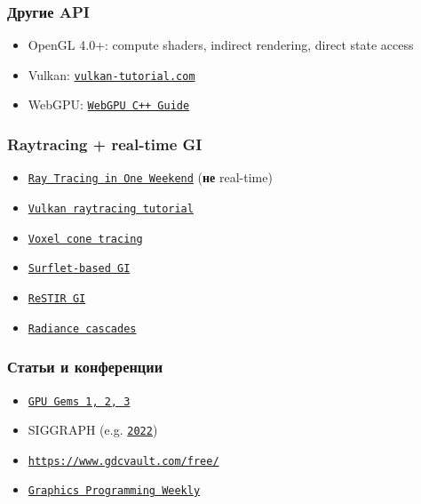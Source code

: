\documentclass{beamer}
\begin{document}
\begin{frame}[fragile]
\frametitle{Другие API}
\begin{itemize}
\item OpenGL 4.0+: compute shaders, indirect rendering, direct state access
\item Vulkan: \href{https://vulkan-tutorial.com}{\texttt{vulkan-tutorial.com}}
\item WebGPU: \href{https://eliemichel.github.io/LearnWebGPU/index.html}{\texttt{WebGPU C++ Guide}}
\end{itemize}
\end{frame}

\begin{frame}[fragile]
\frametitle{Raytracing + real-time GI}
\begin{itemize}
\item \href{https://raytracing.github.io/books/RayTracingInOneWeekend.html}{\texttt{Ray Tracing in One Weekend}} (\textbf{не} real-time)
\item \href{https://developer.nvidia.com/rtx/raytracing/vkray}{\texttt{Vulkan raytracing tutorial}}
\item \href{https://research.nvidia.com/sites/default/files/publications/GIVoxels-pg2011-authors.pdf}{\texttt{Voxel cone tracing}}
\item \href{https://www.ea.com/seed/news/siggraph21-global-illumination-surfels}{\texttt{Surflet-based GI}}
\item \href{https://research.nvidia.com/publication/2021-06_restir-gi-path-resampling-real-time-path-tracing}{\texttt{ReSTIR GI}}
\item \href{https://radiance-cascades.com/}{\texttt{Radiance cascades}}
\end{itemize}
\end{frame}

\begin{frame}[fragile]
\frametitle{Статьи и конференции}
\begin{itemize}
\item \href{https://developer.nvidia.com/gpugems}{\texttt{GPU Gems 1, 2, 3}}
\item SIGGRAPH (e.g. \href{https://kesen.realtimerendering.com/sig2022.html}{\texttt{2022}})
\item \href{GDC}{\texttt{https://www.gdcvault.com/free/}}
\item \href{https://www.jendrikillner.com/tags/weekly/}{\texttt{Graphics Programming Weekly}}
\end{itemize}
\end{frame}
\end{document}
